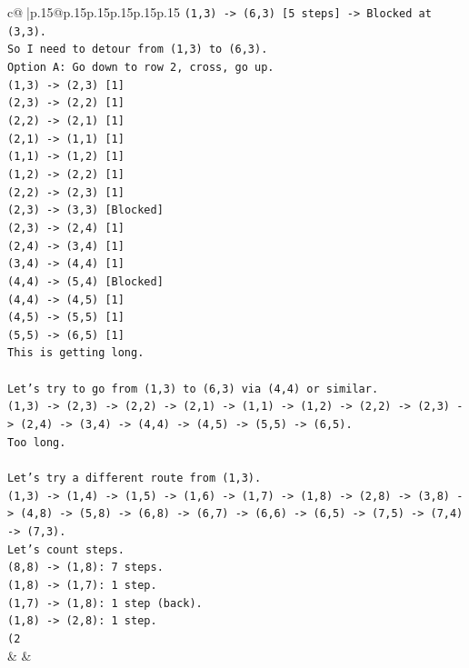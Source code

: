 \documentclass{article}
\begin{document}
{\begin{supertabular}{c@{$\;$}|p{.15\linewidth}@{}p{.15\linewidth}p{.15\linewidth}p{.15\linewidth}p{.15\linewidth}p{.15\linewidth}}
{{{\texttt{(1,3) {-}> (6,3) {[}5 steps{]} {-}> Blocked at (3,3).} \\
\texttt{So I need to detour from (1,3) to (6,3).} \\
\texttt{Option A: Go down to row 2, cross, go up.} \\
\texttt{(1,3) {-}> (2,3) {[}1{]}} \\
\texttt{(2,3) {-}> (2,2) {[}1{]}} \\
\texttt{(2,2) {-}> (2,1) {[}1{]}} \\
\texttt{(2,1) {-}> (1,1) {[}1{]}} \\
\texttt{(1,1) {-}> (1,2) {[}1{]}} \\
\texttt{(1,2) {-}> (2,2) {[}1{]}} \\
\texttt{(2,2) {-}> (2,3) {[}1{]}} \\
\texttt{(2,3) {-}> (3,3) {[}Blocked{]}} \\
\texttt{(2,3) {-}> (2,4) {[}1{]}} \\
\texttt{(2,4) {-}> (3,4) {[}1{]}} \\
\texttt{(3,4) {-}> (4,4) {[}1{]}} \\
\texttt{(4,4) {-}> (5,4) {[}Blocked{]}} \\
\texttt{(4,4) {-}> (4,5) {[}1{]}} \\
\texttt{(4,5) {-}> (5,5) {[}1{]}} \\
\texttt{(5,5) {-}> (6,5) {[}1{]}} \\
\texttt{This is getting long.} \\
\\ 
\texttt{Let's try to go from (1,3) to (6,3) via (4,4) or similar.} \\
\texttt{(1,3) {-}> (2,3) {-}> (2,2) {-}> (2,1) {-}> (1,1) {-}> (1,2) {-}> (2,2) {-}> (2,3) {-}> (2,4) {-}> (3,4) {-}> (4,4) {-}> (4,5) {-}> (5,5) {-}> (6,5).} \\
\texttt{Too long.} \\
\\ 
\texttt{Let's try a different route from (1,3).} \\
\texttt{(1,3) {-}> (1,4) {-}> (1,5) {-}> (1,6) {-}> (1,7) {-}> (1,8) {-}> (2,8) {-}> (3,8) {-}> (4,8) {-}> (5,8) {-}> (6,8) {-}> (6,7) {-}> (6,6) {-}> (6,5) {-}> (7,5) {-}> (7,4) {-}> (7,3).} \\
\texttt{Let's count steps.} \\
\texttt{(8,8) {-}> (1,8): 7 steps.} \\
\texttt{(1,8) {-}> (1,7): 1 step.} \\
\texttt{(1,7) {-}> (1,8): 1 step (back).} \\
\texttt{(1,8) {-}> (2,8): 1 step.} \\
\texttt{(2} \\
            }
        }
    }
    & & \\ \\


\end{supertabular}}
\end{document}
